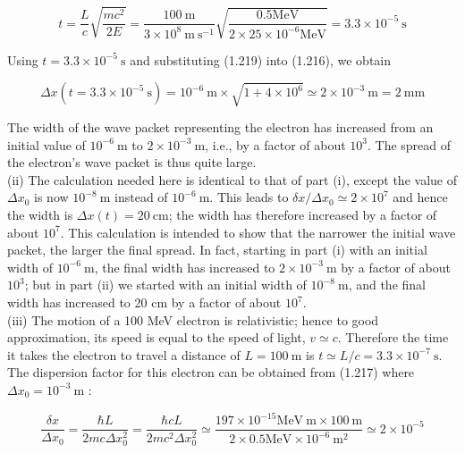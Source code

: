 \documentclass[10pt]{article}
\begin{document}
\begin{equation*}
t=\frac{L}{c} \sqrt{\frac{m c^{2}}{2 E}}=\frac{100 \mathrm{~m}}{3 \times 10^{8} \mathrm{~m} \mathrm{~s}^{-1}} \sqrt{\frac{0.5 \mathrm{MeV}}{2 \times 25 \times 10^{-6} \mathrm{MeV}}}=3.3 \times 10^{-5} \mathrm{~s} \tag{1.220}
\end{equation*}


Using $t=3.3 \times 10^{-5} \mathrm{~s}$ and substituting (1.219) into (1.216), we obtain


\begin{equation*}
\Delta x\left(t=3.3 \times 10^{-5} \mathrm{~s}\right)=10^{-6} \mathrm{~m} \times \sqrt{1+4 \times 10^{6}} \simeq 2 \times 10^{-3} \mathrm{~m}=2 \mathrm{~mm} \tag{1.221}
\end{equation*}


The width of the wave packet representing the electron has increased from an initial value of $10^{-6} \mathrm{~m}$ to $2 \times 10^{-3} \mathrm{~m}$, i.e., by a factor of about $10^{3}$. The spread of the electron's wave packet is thus quite large.\\
(ii) The calculation needed here is identical to that of part (i), except the value of $\Delta x_{0}$ is now $10^{-8} \mathrm{~m}$ instead of $10^{-6} \mathrm{~m}$. This leads to $\delta x / \Delta x_{0} \simeq 2 \times 10^{7}$ and hence the width is $\Delta x(t)=20 \mathrm{~cm}$; the width has therefore increased by a factor of about $10^{7}$. This calculation is intended to show that the narrower the initial wave packet, the larger the final spread. In fact, starting in part (i) with an initial width of $10^{-6} \mathrm{~m}$, the final width has increased to $2 \times 10^{-3} \mathrm{~m}$ by a factor of about $10^{3}$; but in part (ii) we started with an initial width of $10^{-8} \mathrm{~m}$, and the final width has increased to 20 cm by a factor of about $10^{7}$.\\
(iii) The motion of a 100 MeV electron is relativistic; hence to good approximation, its speed is equal to the speed of light, $v \simeq c$. Therefore the time it takes the electron to travel a distance of $L=100 \mathrm{~m}$ is $t \simeq L / c=3.3 \times 10^{-7} \mathrm{~s}$. The dispersion factor for this electron can be obtained from (1.217) where $\Delta x_{0}=10^{-3} \mathrm{~m}$ :


\begin{equation*}
\frac{\delta x}{\Delta x_{0}}=\frac{\hbar L}{2 m c \Delta x_{0}^{2}}=\frac{\hbar c L}{2 m c^{2} \Delta x_{0}^{2}} \simeq \frac{197 \times 10^{-15} \mathrm{MeV} \mathrm{~m} \times 100 \mathrm{~m}}{2 \times 0.5 \mathrm{MeV} \times 10^{-6} \mathrm{~m}^{2}} \simeq 2 \times 10^{-5} \tag{1.222}
\end{equation*}
\end{document}
